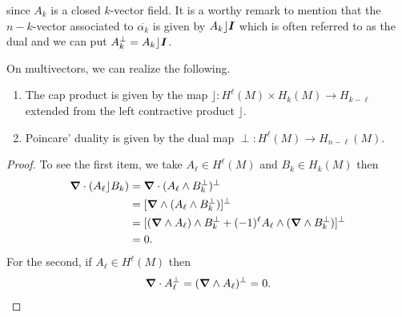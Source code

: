 \documentclass[conf]{new-aiaa}
\begin{document}
since $A_k$ is a closed $k$-vector field. It is a worthy remark to mention that the $n-k$-vector associated to $\overline{\alpha_k}$ is given by $A_k \rfloor \boldsymbol{I}$ which is often referred to as the dual and we can put $A_k^\perp = A_k \rfloor \boldsymbol{I}$. 
\begin{proposition}
On multivectors, we can realize the following.
\begin{enumerate}
    \item The cap product is given by the map $\rfloor \colon H^\ell(M)\times H_{k}(M) \to H_{k-\ell}$ extended from the left contractive product $\rfloor$.
    \item Poincare' duality is given by the dual map $\perp \colon H^\ell(M) \to H_{n-\ell}(M)$.
\end{enumerate}
\end{proposition}
\begin{proof}
To see the first item, we take $A_\ell\in H^\ell(M)$ and $B_k \in H_k(M)$ then
\begin{align}
    \boldsymbol{\nabla} \cdot (A_\ell \rfloor B_k) &= \boldsymbol{\nabla} \cdot (A_\ell \wedge B_k^\perp)^\perp\\
    &= [\boldsymbol{\nabla} \wedge (A_\ell \wedge B_k^\perp)]^\perp\\
    &= [(\boldsymbol{\nabla} \wedge A_\ell)\wedge B_k^\perp +(-1)^\ell A_\ell \wedge (\boldsymbol{\nabla} \wedge B_k^\perp)]^\perp\\
    &= 0.
\end{align}
For the second, if $A_{\ell}\in H^\ell(M)$ then
\begin{align}
    \boldsymbol{\nabla} \cdot A_\ell^\perp = (\boldsymbol{\nabla} \wedge A_\ell)^\perp = 0.
\end{align}
\end{proof}
\end{document}

